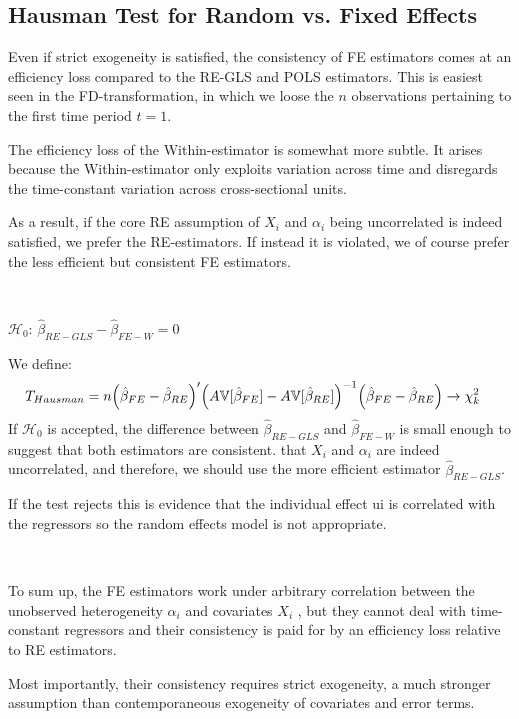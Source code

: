 \subsection{Hausman Test for Random vs. Fixed Effects}

Even if strict exogeneity is satisfied, the consistency of FE estimators comes at an efficiency
loss compared to the RE-GLS and POLS estimators.
This is easiest seen in the FD-transformation, in which we loose the $n$ observations pertaining to the first time period $t=1$.

The efficiency loss of the Within-estimator is somewhat more subtle.
It arises because the Within-estimator only exploits variation across time and disregards the
time-constant variation across cross-sectional units.

As a result, if the core RE assumption of $X_i$ and $\alpha_i$ being uncorrelated is indeed satisfied, 
we prefer the RE-estimators. If instead it is violated, we of course prefer the less efficient but consistent FE estimators.

\begin{theorem}\label{Hausman-test}
    \
    
    $\mathcal{H}_0$: $\hat{\beta}_{RE-GLS} - \hat{\beta}_{FE-W} = 0$ 

    We define:
    \begin{align*}
        T_{Hausman} &= n \Bigl(\hat{\beta}_{FE} - \hat{\beta}_{RE} \Bigr)^{\prime} \Bigl( A\mathbb{V}[\hat{\beta}_{FE}] - A\mathbb{V}[\hat{\beta}_{RE}] \Bigr)^{-1} \Bigl(\hat{\beta}_{FE} - \hat{\beta}_{RE}\Bigr) \rightarrow \chi_k^2
    \end{align*}
    If $\mathcal{H}_0$ is accepted, the difference between $\hat{\beta}_{RE-GLS}$ and $\hat{\beta}_{FE-W}$ is small enough to suggest that
    both estimators are consistent. that $X_i$ and $\alpha_i$ are indeed uncorrelated, and therefore, 
    we should use the more efficient estimator $\hat{\beta}_{RE-GLS}$.

    If the test rejects this is evidence that the individual effect ui is correlated with the regressors so the random effects model is not appropriate.
\end{theorem}

\begin{note}
    \

    To sum up, the FE estimators work under arbitrary correlation between the unobserved
heterogeneity $\alpha_i$ and covariates $X_i$ , but they cannot deal with time-constant regressors and
their consistency is paid for by an efficiency loss relative to RE estimators.

    Most importantly, their consistency requires strict exogeneity, 
    a much stronger assumption than contemporaneous exogeneity of covariates and error terms.
\end{note}

